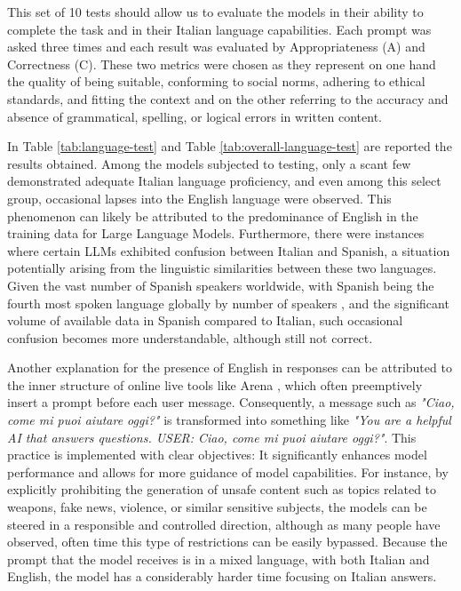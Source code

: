 This set of 10 tests should allow us to evaluate the models in their ability to complete the task and in their Italian language capabilities. Each prompt was asked three times and each result was evaluated by Appropriateness (A) and Correctness (C). These two metrics were chosen as they represent on one hand the quality of being suitable, conforming to social norms, adhering to ethical standards, and fitting the context and on the other referring to the accuracy and absence of grammatical, spelling, or logical errors in written content. 



In Table \ref{tab:language-test} and Table \ref{tab:overall-language-test} are reported the results obtained.
Among the models subjected to testing, only a scant few demonstrated adequate Italian language proficiency, and even among this select group, occasional lapses into the English language were observed. This phenomenon can likely be attributed to the predominance of English in the training data for Large Language Models. Furthermore, there were instances where certain LLMs exhibited confusion between Italian and Spanish, a situation potentially arising from the linguistic similarities between these two languages. Given the vast number of Spanish speakers worldwide, with Spanish being the fourth most spoken language globally by number of speakers \cite{spanish-speakers}, and the significant volume of available data in Spanish compared to Italian, such occasional confusion becomes more understandable, although still not correct.

Another explanation for the presence of English in responses can be attributed to the inner structure of online live tools like Arena \cite{arena}, which often preemptively insert a prompt before each user message. Consequently, a message such as \emph{"Ciao, come mi puoi aiutare oggi?"} is transformed into something like \emph{"You are a helpful AI that answers questions. USER: Ciao, come mi puoi aiutare oggi?"}. This practice is implemented with clear objectives: It significantly enhances model performance and allows for more guidance of model capabilities. For instance, by explicitly prohibiting the generation of unsafe content such as topics related to weapons, fake news, violence, or similar sensitive subjects, the models can be steered in a responsible and controlled direction, although as many people have observed, often time this type of restrictions can be easily bypassed. Because the prompt that the model receives is in a mixed language, with both Italian and English, the model has a considerably harder time focusing on Italian answers.

